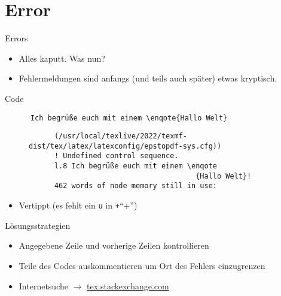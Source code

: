 \section{Error}
\begin{frame}[fragile]{Errors}
  \begin{itemize}
    \item Alles kaputt. Was nun?
    \item Fehlermeldungen sind anfangs (und teils auch später) etwas kryptisch.
  \end{itemize}
  \begin{block}{Code}
    \begin{verbatim}
      Ich begrüße euch mit einem \enqote{Hallo Welt}
    \end{verbatim}
  \end{block}
  \begin{figure}
    \centering
    \begin{verbatim}
      (/usr/local/texlive/2022/texmf-dist/tex/latex/latexconfig/epstopdf-sys.cfg))
      ! Undefined control sequence.
      l.8 Ich begrüße euch mit einem \enqote
                                       {Hallo Welt}!
      462 words of node memory still in use:
    \end{verbatim}
  \end{figure}
  \huge
  \begin{itemize}
    \item<2->[$\Rightarrow$] Vertippt (es fehlt ein \verb+u+ in \texttt+\enquote+)
  \end{itemize}
\end{frame}

\begin{frame}{Lösungsstrategien}
  \Large
  \begin{itemize}
    \item Angegebene Zeile und vorherige Zeilen kontrollieren
    \item Teile des Codes auskommentieren um Ort des Fehlers einzugrenzen
    \item Internetsuche $\rightarrow$ \href{http://tex.stackexchange.com}{tex.stackexchange.com}
  \end{itemize}
\end{frame}
